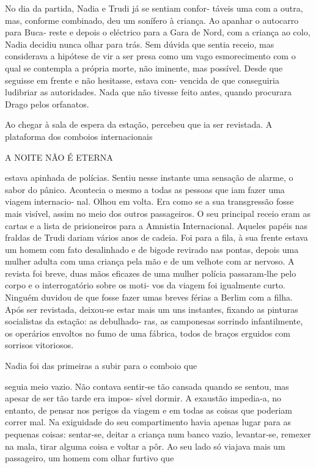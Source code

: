 No dia da partida, Nadia e Trudi já se sentiam confor‑ táveis uma com a
outra, mas, conforme combinado, deu um sonífero à criança. Ao apanhar o
autocarro para Buca‑ reste e depois o eléctrico para a Gara de Nord, com
a criança ao colo, Nadia decidiu nunca olhar para trás. Sem dúvida que
sentia receio, mas considerava a hipótese de vir a ser presa como um
vago esmorecimento com o qual se contempla a própria morte, não
iminente, mas possível. Desde que seguisse em frente e não hesitasse,
estava con‑ vencida de que conseguiria ludibriar as autoridades. Nada
que não tivesse feito antes, quando procurara Drago pelos orfanatos.

Ao chegar à sala de espera da estação, percebeu que ia ser revistada. A
plataforma dos comboios internacionais

A NOITE NÃO É ETERNA

estava apinhada de polícias. Sentiu nesse instante uma sensação de
alarme, o sabor do pânico. Acontecia o mesmo a todas as pessoas que iam
fazer uma viagem internacio‑ nal. Olhou em volta. Era como se a sua
transgressão fosse mais visível, assim no meio dos outros passageiros. O
seu principal receio eram as cartas e a lista de prisioneiros para a
Amnistia Internacional. Aqueles papéis nas fraldas de Trudi dariam
vários anos de cadeia. Foi para a fila, à sua frente estava um homem com
fato desalinhado e de bigode revirado nas pontas, depois uma mulher
adulta com uma criança pela mão e de um velhote com ar nervoso. A
revista foi breve, duas mãos eficazes de uma mulher polícia passaram‑lhe
pelo corpo e o interrogatório sobre os moti‑ vos da viagem foi
igualmente curto. Ninguém duvidou de que fosse fazer umas breves férias
a Berlim com a filha. Após ser revistada, deixou‑se estar mais um uns
instantes, fixando as pinturas socialistas da estação: as debulhado‑
ras, as camponesas sorrindo infantilmente, os operários envoltos no fumo
de uma fábrica, todos de braços erguidos com sorrisos vitoriosos.

Nadia foi das primeiras a subir para o comboio que

seguia meio vazio. Não contava sentir‑se tão cansada quando se sentou,
mas apesar de ser tão tarde era impos‑ sível dormir. A exaustão
impedia‑a, no entanto, de pensar nos perigos da viagem e em todas as
coisas que poderiam correr mal. Na exiguidade do seu compartimento havia
apenas lugar para as pequenas coisas: sentar‑se, deitar a criança num
banco vazio, levantar‑se, remexer na mala, tirar alguma coisa e voltar a
pôr. Ao seu lado só viajava mais um passageiro, um homem com olhar
furtivo que

